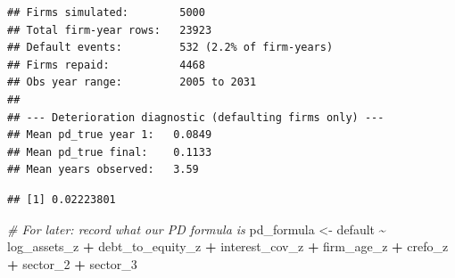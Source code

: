 \documentclass[
]{article}
\newenvironment{Shaded}{\begin{snugshade}}{\end{snugshade}}
\newcommand{\CommentTok}[1]{\textcolor[rgb]{0.56,0.35,0.01}{\textit{#1}}}
\newcommand{\DecValTok}[1]{\textcolor[rgb]{0.00,0.00,0.81}{#1}}
\newcommand{\DocumentationTok}[1]{\textcolor[rgb]{0.56,0.35,0.01}{\textbf{\textit{#1}}}}
\newcommand{\FunctionTok}[1]{\textcolor[rgb]{0.13,0.29,0.53}{\textbf{#1}}}
\newcommand{\NormalTok}[1]{#1}
\newcommand{\OtherTok}[1]{\textcolor[rgb]{0.56,0.35,0.01}{#1}}
\newcommand{\SpecialCharTok}[1]{\textcolor[rgb]{0.81,0.36,0.00}{\textbf{#1}}}
\newcommand{\StringTok}[1]{\textcolor[rgb]{0.31,0.60,0.02}{#1}}
\begin{document}
\begin{verbatim}
## Firms simulated:        5000 
## Total firm-year rows:   23923 
## Default events:         532 (2.2% of firm-years)
## Firms repaid:           4468 
## Obs year range:         2005 to 2031 
## 
## --- Deterioration diagnostic (defaulting firms only) ---
## Mean pd_true year 1:   0.0849 
## Mean pd_true final:    0.1133 
## Mean years observed:   3.59
\end{verbatim}

\begin{Shaded}
\end{Shaded}

\begin{verbatim}
## [1] 0.02223801
\end{verbatim}

\begin{Shaded}
\begin{Highlighting}[]
\CommentTok{\# For later: record what our PD formula is}
\NormalTok{pd\_formula }\OtherTok{\textless{}{-}}\NormalTok{ default }\SpecialCharTok{\textasciitilde{}}\NormalTok{ log\_assets\_z }\SpecialCharTok{+}\NormalTok{ debt\_to\_equity\_z }\SpecialCharTok{+}\NormalTok{ interest\_cov\_z }\SpecialCharTok{+}
\NormalTok{                             firm\_age\_z }\SpecialCharTok{+}\NormalTok{ crefo\_z }\SpecialCharTok{+}\NormalTok{ sector\_2 }\SpecialCharTok{+}\NormalTok{ sector\_3}
\end{Highlighting}
\end{Shaded}

\begin{Shaded}
\end{Shaded}
\end{document}
